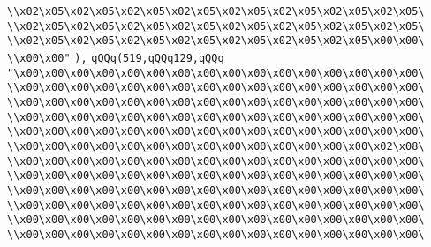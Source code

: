 \verb|\\x02\x05\x02\x05\x02\x05\x02\x05\x02\x05\x02\x05\x02\x05\x02\x05\|\newline
\verb|\\x02\x05\x02\x05\x02\x05\x02\x05\x02\x05\x02\x05\x02\x05\x02\x05\|\newline
\verb|\\x02\x05\x02\x05\x02\x05\x02\x05\x02\x05\x02\x05\x02\x05\x00\x00\|\newline
\verb|\\x00\x00"|\newline
\verb|),|\newline
\verb|qQQq(519,qQQq129,qQQq|\newline
\verb|"\x00\x00\x00\x00\x00\x00\x00\x00\x00\x00\x00\x00\x00\x00\x00\x00\|\newline
\verb|\\x00\x00\x00\x00\x00\x00\x00\x00\x00\x00\x00\x00\x00\x00\x00\x00\|\newline
\verb|\\x00\x00\x00\x00\x00\x00\x00\x00\x00\x00\x00\x00\x00\x00\x00\x00\|\newline
\verb|\\x00\x00\x00\x00\x00\x00\x00\x00\x00\x00\x00\x00\x00\x00\x00\x00\|\newline
\verb|\\x00\x00\x00\x00\x00\x00\x00\x00\x00\x00\x00\x00\x00\x00\x00\x00\|\newline
\verb|\\x00\x00\x00\x00\x00\x00\x00\x00\x00\x00\x00\x00\x00\x00\x02\x08\|\newline
\verb|\\x00\x00\x00\x00\x00\x00\x00\x00\x00\x00\x00\x00\x00\x00\x00\x00\|\newline
\verb|\\x00\x00\x00\x00\x00\x00\x00\x00\x00\x00\x00\x00\x00\x00\x00\x00\|\newline
\verb|\\x00\x00\x00\x00\x00\x00\x00\x00\x00\x00\x00\x00\x00\x00\x00\x00\|\newline
\verb|\\x00\x00\x00\x00\x00\x00\x00\x00\x00\x00\x00\x00\x00\x00\x00\x00\|\newline
\verb|\\x00\x00\x00\x00\x00\x00\x00\x00\x00\x00\x00\x00\x00\x00\x00\x00\|\newline
\verb|\\x00\x00\x00\x00\x00\x00\x00\x00\x00\x00\x00\x00\x00\x00\x00\x00\|\newline
